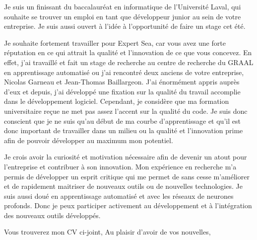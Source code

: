 \documentclass[11pt, letterpaper]{awesome-cv} %
\begin{document}
\makecvheader %

\makelettertitle %


\begin{cvletter}


\vspace{10mm}

Je suis un finissant du baccalauréat en informatique de l'Université Laval, qui souhaite se trouver un emploi en tant que développeur junior au sein de votre entreprise. Je suis aussi ouvert à l'idée à l'opportunité de faire un stage cet été. 

Je souhaite fortement travailler pour Expert Sea, car vous avez une forte réputation en ce qui attrait la qualité et l'innovation de ce que vous concevez. En effet, j'ai travaillé et fait un stage de recherche au centre de recherche du GRAAL en apprentissage automatisé ou j'ai rencontré deux anciens de votre entreprise, Nicolas Garneau et Jean-Thomas Baillargeon. J'ai énormément appris auprès d'eux et depuis, j'ai développé une fixation sur la qualité du travail accomplie dans le développement logiciel. Cependant, je considère que ma formation universitaire reçue ne met pas assez l'accent sur la qualité du code. Je suis donc conscient que je ne suis qu’au début de ma courbe d'apprentissage et qu'il est donc important de travailler dans un milieu ou la qualité et l'innovation prime afin de pouvoir développer au maximum mon potentiel.

Je crois avoir la curiosité et motivation nécessaire afin de devenir un atout pour l'entreprise et contribuer à son innovation. Mon expérience en recherche m'a permis de développer un esprit critique qui me permet de sans cesse m'améliorer et de rapidement maitriser de nouveaux outils ou de nouvelles technologies. Je suis aussi doué en apprentissage automatisé et avec les réseaux de neurones profonds. Donc je peux participer activement au développement et à l'intégration des nouveaux outils développés. 

Vous trouverez mon CV ci-joint,
Au plaisir d'avoir de vos nouvelles,
 



\end{cvletter}


\vspace{15mm}

\makeletterclosing %
\end{document}
